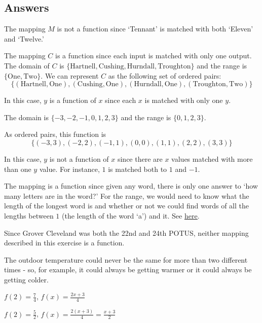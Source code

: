 \clearpage


\subsection{Answers}

\begin{tasks}

\task  The mapping $M$ is not a function since  `Tennant' is matched with both `Eleven' and `Twelve.'

\task  The mapping $C$ is a function since each input is matched with only one output.  The domain of $C$ is $\{ \text{Hartnell}, \text{Cushing}, \text{Hurndall}, \text{Troughton} \}$ and the range is $\{\text{One}, \text{Two} \}$.  We can represent $C$ as the following set of ordered pairs:
\[
      \{ (\text{Hartnell}, \text{One}), (\text{Cushing}, \text{One}),  (\text{Hurndall}, \text{One}), (\text{Troughton}, \text{Two}) \}
\]

\task  In this case, $y$ is a function of $x$ since each $x$ is matched with only one $y$.  

The domain is $\{ -3, -2, -1,0,1,2,3 \}$ and the range is $\{ 0,1,2,3 \}$.  

As ordered pairs, this function is
\[
\{ (-3,3), (-2,2), (-1,1), (0,0), (1,1), (2,2), (3,3) \}
\]

\task  In this case, $y$ is not a function of $x$ since there are $x$ values matched with more than one $y$ value.  For instance, $1$ is matched both to $1$ and $-1$.

\task    The mapping is a function since given any word, there is only one answer to `how many letters are in the word?'  For the range, we would need to know what the length of the longest word is and whether or not we could find words of all the lengths between $1$ (the length of the word `a') and it.  See \href{https://en.wikipedia.org/wiki/Longest_word_in_English}{\underline{here}}.

\task  Since Grover Cleveland was both the 22nd and 24th POTUS, neither mapping described in this exercise is a function.

\task  The outdoor temperature could never be the same for more than two different times - so, for example, it could always be getting warmer or it could always be getting colder.

\task $f(2) = \frac{7}{4}$, $f(x) = \frac{2x+3}{4}$

\task $f(2) = \frac{5}{2}$, $f(x) = \frac{2(x+3)}{4} = \frac{x+3}{2}$  


\end{tasks}
